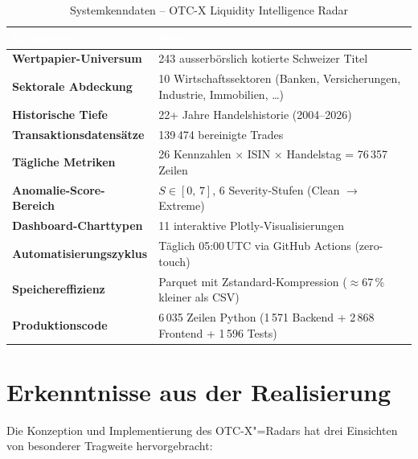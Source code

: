 \documentclass[11pt, a4paper, oneside, openany]{report}
\begin{document}
\begin{table}[H]
\centering
\caption{Systemkenndaten -- OTC-X Liquidity Intelligence Radar}
\label{tab:kenndaten}
\sffamily\small
{}
\begin{tabularx}{\textwidth}{>{\bfseries}l X}
  \toprule
  \rowcolor{DeepNavy} \textcolor{white}{\textbf{Kenngrösse}} & \textcolor{white}{\textbf{Wert}} \\
  \midrule
  Wertpapier-Universum        & 243 ausserbörslich kotierte Schweizer Titel \\
  Sektorale Abdeckung         & 10 Wirtschaftssektoren (Banken, Versicherungen, Industrie, Immobilien, \ldots) \\
  Historische Tiefe            & 22+ Jahre Handelshistorie (2004--2026) \\
  Transaktionsdatensätze       & 139\,474 bereinigte Trades \\
  Tägliche Metriken            & 26 Kennzahlen $\times$ ISIN $\times$ Handelstag = 76\,357 Zeilen \\
  Anomalie-Score-Bereich       & $S \in [0,\,7]$, 6 Severity-Stufen (Clean $\to$ Extreme) \\
  Dashboard-Charttypen         & 11 interaktive Plotly-Visualisierungen \\
  Automatisierungszyklus       & Täglich 05:00\,UTC via GitHub Actions (zero-touch) \\
  Speichereffizienz            & Parquet mit Zstandard-Kompression ($\approx$67\,\% kleiner als CSV) \\
  Produktionscode              & 6\,035 Zeilen Python (1\,571 Backend + 2\,868 Frontend + 1\,596 Tests) \\
  \bottomrule
\end{tabularx}
\end{table}

\section{Erkenntnisse aus der Realisierung}

Die Konzeption und Implementierung des OTC-X"=Radars hat drei Einsichten von besonderer Tragweite hervorgebracht:
\end{document}
